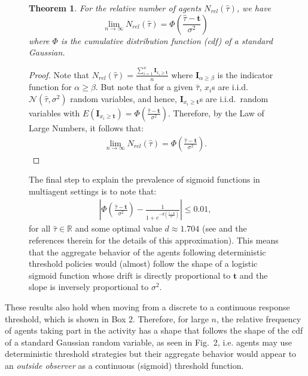 \documentclass{nature}
\newtheorem{theorem}{Theorem}
\def\R{\mathbb{R}}    %
\def\td{\mathbf{t}}   %
\begin{document}
\nolinenumbers
\begin{figure}
\begin{framed}
\begin{theorem}\label{thrm:relativefrequency}
For the relative number of agents $N_{rel}(\hat{\tau})$, we have
\begin{equation}
\lim_{n\to\infty}N_{rel}(\hat{\tau})=\Phi(\frac{\hat{\tau}-\td}{\sigma^2})
\end{equation}
where $\Phi$ is the cumulative distribution function (cdf) of a standard Gaussian. 
\end{theorem}
\begin{proof}
Note that $N_{rel}(\hat{\tau})=\frac{\sum_{i=1}^n\mathbf{I}_{x_i\geq \td}}{n}$ where $\mathbf{I}_{\alpha\geq \beta}$ is the indicator function for $\alpha\geq \beta$. But note that for a given $\hat{\tau}$, $x_i$s are i.i.d.\ $\mathcal{N}(\hat{\tau},\sigma^2)$ random variables, and hence, $\mathbf{I}_{x_i\geq \td}$s are i.i.d.\ random variables with $E(\mathbf{I}_{x_i\geq \td})=\Phi(\frac{\hat{\tau}-\td}{\sigma^2})$. Therefore, by the Law of Large Numbers, it follows that:
\vspace{-5px}
\begin{align*}
\lim_{n\to\infty}N_{rel}(\hat{\tau})=\Phi(\frac{\hat{\tau}-\td}{\sigma^2}).
\end{align*}
\vspace{-35px}
\end{proof}
\vspace{-30px}
The final step to explain the prevalence of sigmoid functions in multiagent settings is to note that:
\begin{align*}
|\Phi(\frac{\hat{\tau}-\td}{\sigma^2})-\frac{1}{1+e^{-d(\frac{\hat{\tau}-\td}{\sigma^2})}}|\leq 0.01,
\end{align*}
for all $\hat{\tau}\in\R$ and some optimal value $d\approx 1.704$ (see \cite{camilli1994} and the references therein for the details of this approximation). This means that the aggregate behavior of the agents following deterministic threshold policies would (almost) follow the shape of a logistic sigmoid function whose drift is directly proportional to $\td$ and the slope  is inversely proportional to $\sigma^2$. 
\end{framed}
\end{figure}

\linenumbers
These results also hold when moving from a discrete to a continuous response threshold, which is shown in Box 2. Therefore, for large $n$, the relative frequency of agents taking part in the activity has a shape that follows the shape of the cdf of a standard Gaussian random variable, as seen in Fig.~2, i.e. agents may use deterministic threshold strategies but their aggregate behavior would appear to an \textit{outside observer} as a continuous (sigmoid) threshold function.
\end{document}
